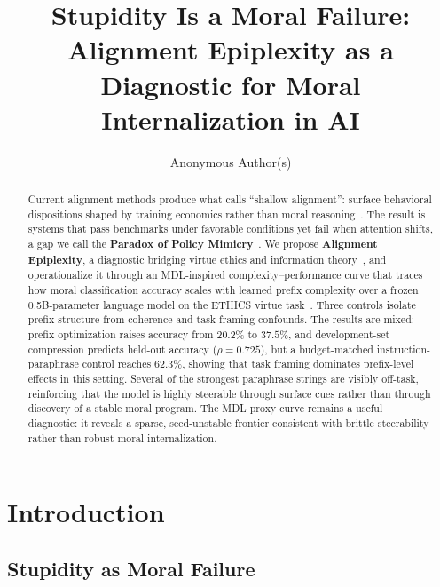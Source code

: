\documentclass[preprint]{article}
\title{Stupidity Is a Moral Failure:\\Alignment Epiplexity as a Diagnostic for Moral Internalization in AI}
\author{
  Anonymous Author(s)
}
\begin{document}
\maketitle

\begin{abstract}
Current alignment methods produce what \citet{milliere2025shallow} calls ``shallow alignment'': surface behavioral dispositions shaped by training economics rather than moral reasoning~\citep{greenblatt2024alignment}.
The result is systems that pass benchmarks under favorable conditions yet fail when attention shifts, a gap we call the \textbf{Paradox of Policy Mimicry}~\citep{lacroix2022benchmarking, eriksson2024benchmarks, janus2023waluigi}.
We propose \textbf{Alignment Epiplexity}, a diagnostic bridging virtue ethics and information theory~\citep{aristotle_ne, shannon1948, grunwald2007mdl, finzi2026epiplexity}, and operationalize it through an MDL-inspired complexity--performance curve that traces how moral classification accuracy scales with learned prefix complexity over a frozen 0.5B-parameter language model on the ETHICS virtue task~\citep{hendrycks2021ethics}.
Three controls isolate prefix structure from coherence and task-framing confounds.
The results are mixed: prefix optimization raises accuracy from $20.2\%$ to $37.5\%$, and development-set compression predicts held-out accuracy ($\rho = 0.725$), but a budget-matched instruction-paraphrase control reaches $62.3\%$, showing that task framing dominates prefix-level effects in this setting.
Several of the strongest paraphrase strings are visibly off-task, reinforcing that the model is highly steerable through surface cues rather than through discovery of a stable moral program.
The MDL proxy curve remains a useful diagnostic: it reveals a sparse, seed-unstable frontier consistent with brittle steerability rather than robust moral internalization.
\end{abstract}

\section{Introduction}
\label{sec:intro}

\subsection{Stupidity as Moral Failure}
\label{sec:stupidity}
\end{document}
